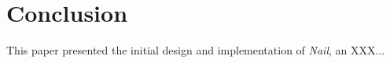 \section{Conclusion}
\label{s:concl}

This paper presented the initial design and implementation of
\textit{Nail}, an XXX...

